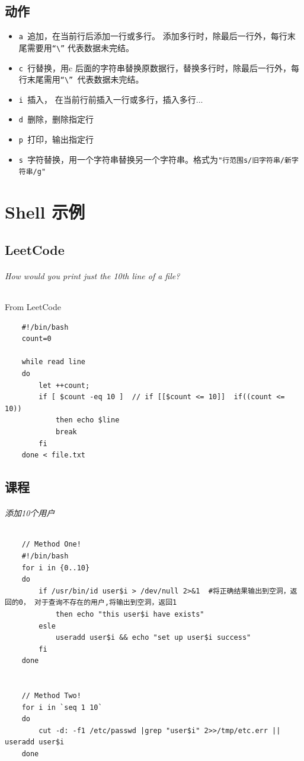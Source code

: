 \documentclass[UTF8,a4paper,12pt]{ctexbook}
\begin{document}
	\section{动作}
		\begin{itemize}
			\item \verb|a |追加，在当前行后添加一行或多行。 添加多行时，除最后一行外，每行末尾需要用\verb|“\”| 代表数据未完结。
			\item \verb|c |行替换，用c 后面的字符串替换原数据行，替换多行时，除最后一行外，每行末尾需用\verb|“\” |代表数据未完结。
			\item \verb|i |插入， 在当前行前插入一行或多行，插入多行...
			\item \verb|d |删除，删除指定行
			\item \verb|p |打印，输出指定行
			\item \verb|s |字符替换，用一个字符串替换另一个字符串。格式为\verb|"行范围s/旧字符串/新字符串/g"|
		\end{itemize}
		 	
		 	
		 	
\chapter{Shell 示例}
	\section{LeetCode}
		 \subparagraph{How would you print just the 10th line of a file?}From LeetCode
			\begin{lstlisting}
	#!/bin/bash
	count=0
	
	while read line
	do
		let ++count;
		if [ $count -eq 10 ]  // if [[$count <= 10]]  if((count <= 10))
			then echo $line
			break
		fi
	done < file.txt
			\end{lstlisting}	
			
	\section{课程}
		\subparagraph{添加10个用户}
			\begin{lstlisting}
	// Method One!
	#!/bin/bash
	for i in {0..10} 
	do 
		if /usr/bin/id user$i > /dev/null 2>&1  #将正确结果输出到空洞，返回的0， 对于查询不存在的用户,将输出到空洞，返回1
			then echo "this user$i have exists"
		esle
			useradd user$i && echo "set up user$i success"
		fi
	done
	
	
	// Method Two!
	for i in `seq 1 10`
	do
		cut -d: -f1 /etc/passwd |grep "user$i" 2>>/tmp/etc.err || useradd user$i
	done
			\end{lstlisting}
			
\end{document}
